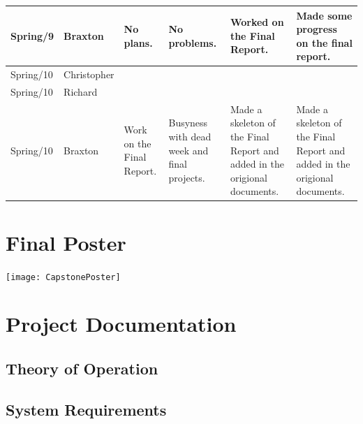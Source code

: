 \documentclass[onecolumn, draftclsnofoot,10pt, compsoc]{IEEEtran}
\begin{document}
\begin{tiny}
\begin{longtable}{ | p{} | p{} | p{} | p{} | p{} | p{} | }
\\ \hline
Spring/9 & Braxton & 

No plans.

&

No problems.

&

Worked on the Final Report.

&

Made some progress on the final report.

\\ \hline
Spring/10 & Christopher & 

&

&

&

\\ \hline
Spring/10 & Richard & 

&

&

&

\\ \hline
Spring/10 & Braxton & 

Work on the Final Report.

&

Busyness with dead week and final projects.

&

Made a skeleton of the Final Report and added in the origional documents.

&

Made a skeleton of the Final Report and added in the origional documents.

\\ \hline
\hline 
\end{longtable}
\end{tiny}


\section{Final Poster}
\texttt{[image: CapstonePoster]}


\section{Project Documentation}

\subsection{Theory of Operation}



\subsection{System Requirements}
\end{document}
